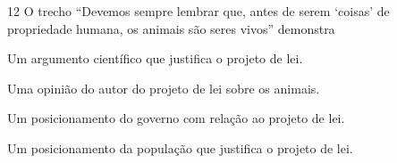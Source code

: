 

\num{12} O trecho ``Devemos sempre lembrar que, antes de serem `coisas'
de propriedade humana, os animais são seres vivos'' demonstra

\begin{escolha}
\item
  Um argumento científico que justifica o projeto de lei.
\item
  Uma opinião do autor do projeto de lei sobre os animais.
\item
  Um posicionamento do governo com relação ao projeto de lei.
\item
  Um posicionamento da população que justifica o projeto de lei.
\end{escolha}




